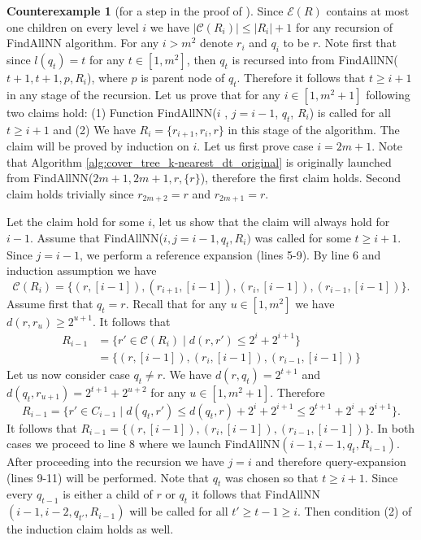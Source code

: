 \documentclass{vgtc}                          %
\numberwithin{algocf}{section}
\theoremstyle{definition}
\theoremstyle{definition}
\theoremstyle{definition}
\newtheorem{cexa}[algocf]{Counterexample}
\theoremstyle{plain}
\newcommand{\C}{\mathcal{C}}
\newcommand{\T}{\mathcal{E}}
\begin{document}
\begin{cexa}[for a step in the proof of {\cite[Theorem~3.1]{ram2009linear}} ]
	\medskip
	\noindent
	Since $\T(R)$ contains at most one children on every level $i$ we have $|\C(R_i)| \leq |R_i| + 1$ for any recursion of FindAllNN algorithm. For any $i > m^2$ denote $r_i$ and $q_i$ to be $r$.
	Note first that since $l(q_t) = t$ for any $t \in [1,m^2]$, then $q_t$ is recursed into from FindAllNN($t+1,t+1,p,R_i$), where $p$ is parent node of $q_t$. Therefore it follows that $t \geq i + 1 $ in any stage of the recursion. 
	Let us prove that for any $i \in [1,m^2+1]$ following two claims hold: (1) Function FindAllNN($i$ , $j = i-1$, $q_t$, $R_i$) is called for all $t \geq i + 1$ and (2) We have  $R_i = \{r_{i+1}, r_{i}, r\}$ in this stage of the algorithm. The claim will be proved by induction on $i$. Let us first prove case $i = 2m+1$.  Note that  Algorithm \ref{alg:cover_tree_k-nearest_dt_original} is originally launched from FindAllNN($2m+1,2m+1,r, \{r\}$), 
	therefore the first claim holds. Second claim holds trivially since $r_{2m+2} = r$ and $r_{2m+1} = r$.
\medskip

\noindent	
	Let the claim hold for some $i$, let us show that the claim will always hold for $i-1$. Assume that FindAllNN($i , j = i-1, q_{t}, R_i)$ was called for some $t \geq i+1$. Since $j = i-1$, we perform a reference expansion (lines 5-9). By line $6$ and induction assumption we have $$\C(R_i) = \{(r,[i-1]), (r_{i+1}, [i-1]), (r_{i},[i-1]), (r_{i-1}, [i-1])\}.$$ Assume first that $q_t = r$.
	Recall that for any $u \in [1,m^2]$ we have $d(r,r_{u}) \geq 2^{u+1} $. It follows that
	\begin{align*}
	R_{i-1} &= \{ r' \in \C(R_i) \mid d(r, r') \leq  2^{i} + 2^{i+1}\} \\
	&= \{(r,[i-1]),(r_{i},[i-1]),(r_{i-1},[i-1])\}
	\end{align*}
	Let us now consider case $q_t \neq r$. We have $d(r,q_t) = 2^{t+1}$ and $d(q_t, r_{u+1}) = 2^{t+1} + 2^{u+2}$ for any $u \in [1,m^2+1]$. Therefore
	$$R_{i-1} = \{ r' \in C_{i-1} \mid d(q_t, r') \leq d(q_t,r) + 2^i + 2^{i+1} \leq 2^{t+1} + 2^{i} + 2^{i+1}\}.$$
	It follows that $R_{i-1} = \{(r,[i-1]), (r_{i},[i-1]), (r_{i-1},[i-1])\}$. In both cases we proceed to line $8$ where we launch FindAllNN$(i-1 , i-1, q_{t}, R_{i-1})$. After proceeding into the recursion we have $j = i$ and therefore query-expansion (lines 9-11) will be performed.  Note that $q_{t}$ was chosen so that $t \geq i+1$. Since every $q_{t-1}$ is either a child of $r$ or $q_{t}$ it follows that FindAllNN$(i-1 , i-2, q_{t'}, R_{i-1})$ will be called for all $t' \geq t-1 \geq i$. Then condition (2) of the induction claim holds as well. 


\end{cexa}
\end{document}
